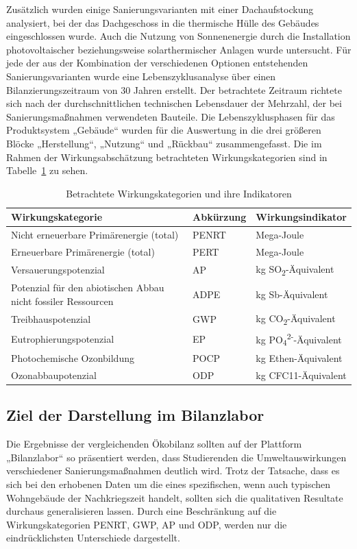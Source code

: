 Zusätzlich wurden einige Sanierungsvarianten mit einer Dachaufstockung analysiert, bei der das Dachgeschoss in die thermische Hülle des Gebäudes eingeschlossen wurde. Auch die Nutzung von Sonnenenergie durch die Installation photovoltaischer beziehungsweise solarthermischer Anlagen wurde untersucht.
Für jede der aus der Kombination der verschiedenen Optionen entstehenden Sanierungsvarianten wurde eine Lebenszyklusanalyse über einen Bilanzierungszeitraum von 30 Jahren erstellt. Der betrachtete Zeitraum richtete sich nach der durchschnittlichen technischen Lebensdauer der Mehrzahl, der bei Sanierungsmaßnahmen verwendeten Bauteile. Die Lebenszyklusphasen für das Produktsystem „Gebäude“ wurden für die Auswertung in die drei größeren Blöcke „Herstellung“, „Nutzung“ und „Rückbau“ zusammengefasst. Die im Rahmen der Wirkungsabschätzung betrachteten Wirkungskategorien sind in Tabelle~\ref{tab:wirkungsindikatoren} zu sehen.

\begin{table}[htpb]
	\caption[Example table]{Betrachtete Wirkungskategorien und ihre Indikatoren}\label{tab:wirkungsindikatoren}
	\centering
	\begin{tabular}{p{7cm} l l}
		\toprule
		Wirkungskategorie & Abkürzung & Wirkungsindikator \\
		\midrule
		Nicht erneuerbare Primärenergie (total) & PENRT & Mega-Joule\\ \hline
		Erneuerbare Primärenergie (total) & PERT & Mega-Joule\\ \hline
		Versauerungspotenzial & AP & kg SO\textsubscript{2}-Äquivalent\\ \hline
		Potenzial für den abiotischen Abbau nicht fossiler Ressourcen & ADPE & kg Sb-Äquivalent\\ \hline
		Treibhauspotenzial & GWP & kg CO\textsubscript{2}-Äquivalent\\ \hline
		Eutrophierungspotenzial & EP & kg PO\textsubscript{4}\textsuperscript{2-}-Äquivalent\\ \hline
		Photochemische Ozonbildung & POCP & kg Ethen-Äquivalent\\ \hline
		Ozonabbaupotenzial & ODP & kg CFC11-Äquivalent\\ \hline
		\bottomrule
	\end{tabular}
\end{table}

\subsection{Ziel der Darstellung im Bilanzlabor}
Die Ergebnisse der vergleichenden Ökobilanz sollten auf der Plattform „Bilanzlabor“ so präsentiert werden, dass Studierenden die Umweltauswirkungen verschiedener Sanierungsmaßnahmen deutlich wird. Trotz der Tatsache, dass es sich bei den erhobenen Daten um die eines spezifischen, wenn auch typischen Wohngebäude der Nachkriegszeit handelt,  sollten sich die qualitativen Resultate durchaus generalisieren lassen. Durch eine Beschränkung auf die Wirkungskategorien PENRT, GWP, AP und ODP, werden nur die eindrücklichsten Unterschiede dargestellt.

